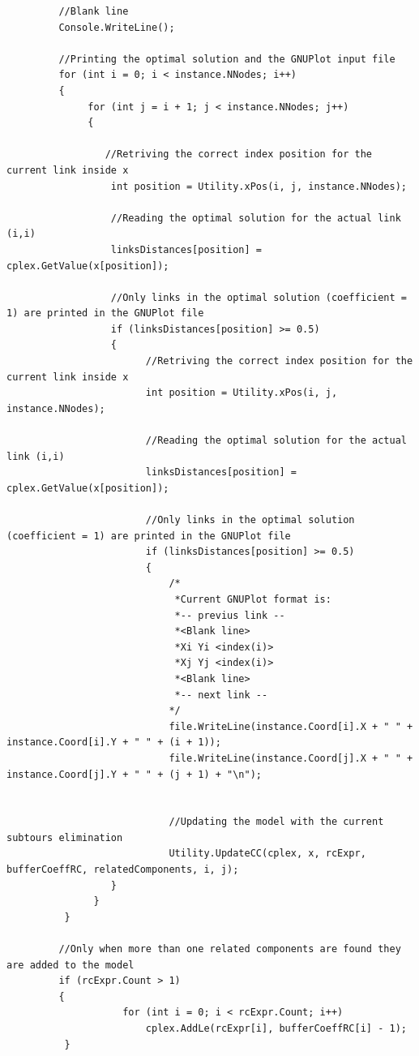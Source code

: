 \documentclass[11pt]{article}
\begin{document}
\begin{lstlisting}
         //Blank line
         Console.WriteLine();

         //Printing the optimal solution and the GNUPlot input file
         for (int i = 0; i < instance.NNodes; i++)
         {
              for (int j = i + 1; j < instance.NNodes; j++)
              {

                 //Retriving the correct index position for the current link inside x
                  int position = Utility.xPos(i, j, instance.NNodes);

                  //Reading the optimal solution for the actual link (i,i)
                  linksDistances[position] = cplex.GetValue(x[position]);

                  //Only links in the optimal solution (coefficient = 1) are printed in the GNUPlot file
                  if (linksDistances[position] >= 0.5)
                  {                 
                        //Retriving the correct index position for the current link inside x
                        int position = Utility.xPos(i, j, instance.NNodes);

                        //Reading the optimal solution for the actual link (i,i)
                        linksDistances[position] = cplex.GetValue(x[position]);

                        //Only links in the optimal solution (coefficient = 1) are printed in the GNUPlot file
                        if (linksDistances[position] >= 0.5)
                        {
                            /*
                             *Current GNUPlot format is:
                             *-- previus link --
                             *<Blank line>
                             *Xi Yi <index(i)>
                             *Xj Yj <index(i)>
                             *<Blank line> 
                             *-- next link --
                            */
                            file.WriteLine(instance.Coord[i].X + " " + instance.Coord[i].Y + " " + (i + 1));
                            file.WriteLine(instance.Coord[j].X + " " + instance.Coord[j].Y + " " + (j + 1) + "\n");
                  
                 
                            //Updating the model with the current subtours elimination
                            Utility.UpdateCC(cplex, x, rcExpr, bufferCoeffRC, relatedComponents, i, j);
                  }
               }
          } 

         //Only when more than one related components are found they are added to the model
         if (rcExpr.Count > 1)
         {
                    for (int i = 0; i < rcExpr.Count; i++)
                        cplex.AddLe(rcExpr[i], bufferCoeffRC[i] - 1);
          }


\end{lstlisting}
\end{document}
